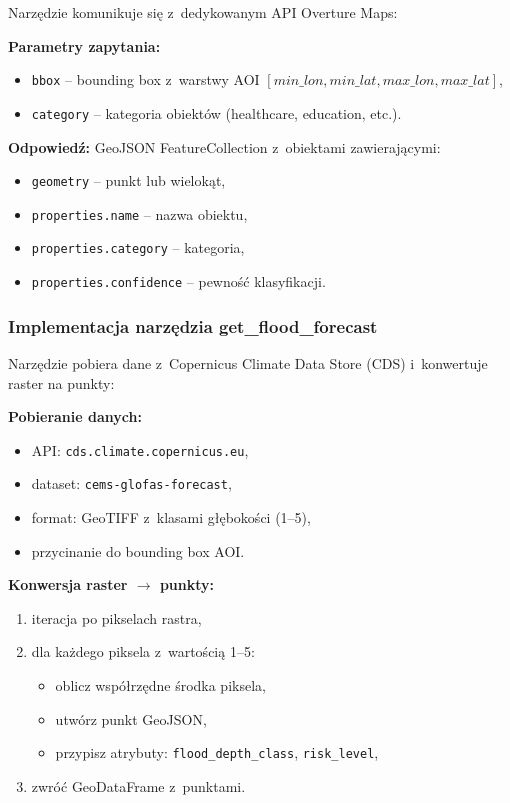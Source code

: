 Narzędzie komunikuje się z~dedykowanym API Overture Maps:

\textbf{Parametry zapytania:}
\begin{itemize}
    \item \texttt{bbox} -- bounding box z~warstwy AOI $[min\_lon, min\_lat, max\_lon, max\_lat]$,
    \item \texttt{category} -- kategoria obiektów (healthcare, education, etc.).
\end{itemize}

\textbf{Odpowiedź:} GeoJSON FeatureCollection z~obiektami zawierającymi:
\begin{itemize}
    \item \texttt{geometry} -- punkt lub wielokąt,
    \item \texttt{properties.name} -- nazwa obiektu,
    \item \texttt{properties.category} -- kategoria,
    \item \texttt{properties.confidence} -- pewność klasyfikacji.
\end{itemize}

\subsubsection{Implementacja narzędzia get\_flood\_forecast}

Narzędzie pobiera dane z~Copernicus Climate Data Store (CDS) i~konwertuje raster na punkty:

\textbf{Pobieranie danych:}
\begin{itemize}
    \item API: \texttt{cds.climate.copernicus.eu},
    \item dataset: \texttt{cems-glofas-forecast},
    \item format: GeoTIFF z~klasami głębokości (1--5),
    \item przycinanie do bounding box AOI.
\end{itemize}

\textbf{Konwersja raster $\rightarrow$ punkty:}
\begin{enumerate}
    \item iteracja po pikselach rastra,
    \item dla każdego piksela z~wartością 1--5:
    \begin{itemize}
        \item oblicz współrzędne środka piksela,
        \item utwórz punkt GeoJSON,
        \item przypisz atrybuty: \texttt{flood\_depth\_class}, \texttt{risk\_level},
    \end{itemize}
    \item zwróć GeoDataFrame z~punktami.
\end{enumerate}

